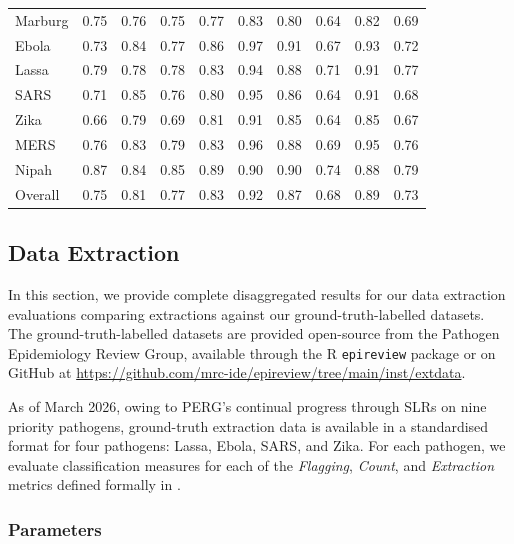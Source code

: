 \begin{table}[h]
{\begin{tabular}{l|ccc|ccc|ccc}
\midrule
Marburg & 0.75 & 0.76 & 0.75 & 0.77 & 0.83 & 0.80 & 0.64 & 0.82 & 0.69 \\
Ebola & 0.73 & 0.84 & 0.77 & 0.86 & 0.97 & 0.91 & 0.67 & 0.93 & 0.72 \\
Lassa & 0.79 & 0.78 & 0.78 & 0.83 & 0.94 & 0.88 & 0.71 & 0.91 & 0.77 \\
SARS & 0.71 & 0.85 & 0.76 & 0.80 & 0.95 & 0.86 & 0.64 & 0.91 & 0.68 \\
Zika & 0.66 & 0.79 & 0.69 & 0.81 & 0.91 & 0.85 & 0.64 & 0.85 & 0.67 \\
MERS & 0.76 & 0.83 & 0.79 & 0.83 & 0.96 & 0.88 & 0.69 & 0.95 & 0.76 \\
Nipah & 0.87 & 0.84 & 0.85 & 0.89 & 0.90 & 0.90 & 0.74 & 0.88 & 0.79 \\
\midrule
Overall & 0.75 & 0.81 & 0.77 & 0.83 & 0.92 & 0.87 & 0.68 & 0.89 & 0.73 \\
\bottomrule
\end{tabular}
}
\end{table}


\clearpage












\subsection{Data Extraction}\label{app:data_extraction_extended}
In this section, we provide complete disaggregated results for our data extraction evaluations comparing \name{} extractions against our ground-truth-labelled datasets. The ground-truth-labelled datasets are provided open-source from the Pathogen Epidemiology Review Group, available through the R \texttt{epireview} package or on GitHub at \href{https://github.com/mrc-ide/epireview/tree/main/inst/extdata}{https://github.com/mrc-ide/epireview/tree/main/inst/extdata}.

As of March 2026, owing to PERG's continual progress through SLRs on nine priority pathogens, ground-truth extraction data is available in a standardised format for four pathogens: Lassa, Ebola, SARS, and Zika. For each pathogen, we evaluate classification measures for each of the \textit{Flagging}, \textit{Count}, and \textit{Extraction} metrics defined formally in .

\subsubsection*{Parameters}

